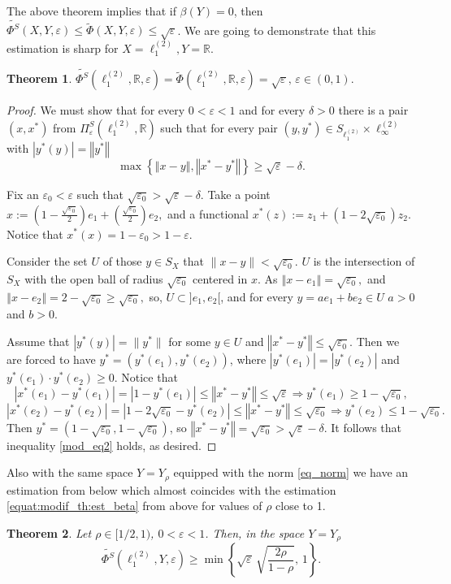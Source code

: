 \documentclass[11pt,a4paper]{amsart}
\newcommand{\R}{{\mathbb{R}}}
\newcommand{\eps}{\varepsilon}
\newcommand{\norm}[1]{\left\Vert#1\right\Vert}
\numberwithin{equation}{section}
\theoremstyle{plain}
\newtheorem{theorem}{Theorem}[section]
\theoremstyle{definition}
\renewcommand{\leq}{\leqslant}
\renewcommand{\geq}{\geqslant}
\begin{document}
The above theorem implies that if $\beta(Y)=0$, then $\widetilde{\Phi^S}(X,Y,\varepsilon)\leq\widetilde{\Phi}(X,Y,\varepsilon)\leq\sqrt{\varepsilon}$. We are going to demonstrate that this estimation is sharp for $X=\ell^{(2)}_1, Y=\R$.

\begin{theorem}
\quad $\widetilde{\Phi^S}(\ell^{(2)}_1,\R,\varepsilon) = \widetilde{\Phi}(\ell^{(2)}_1,\R,\varepsilon) =\sqrt{\varepsilon} , \,\eps\in(0, 1).$
\end{theorem}
\begin{proof}
We must show that for every $0<\eps<1$ and for every $\delta> 0$ there is a pair $(x, x^*)$ from $\Pi^S_\eps(\ell^{(2)}_1, \R)$ such that for every pair $(y, y^*)\in S_{\ell^{(2)}_1}\times \ell^{(2)}_\infty$ with $|y^*(y)|=\norm{y^*}$
\begin{equation}\label{mod_eq2}
\max\left\{ \norm{x-y}, \norm{x^*-y^*}\right\}\geq \sqrt{\varepsilon}-\delta.
\end{equation}

Fix an $\eps_0<\eps$ such that $\sqrt{\eps_0}>\sqrt{\eps}-\delta$. Take a point $x:=\left( 1-\frac{\sqrt{\eps_0}}{2}\right)e_1 +\left( \frac{\sqrt{\eps_0}}{2} \right)e_2,$
and a functional 
$x^*(z):=z_1+(1-2\sqrt{\eps_0})z_2.$
Notice that $x^*(x)=1-\eps_0>1-\eps$. 

Consider the set $U$ of those $y \in S_X$ that  $\|x-y\| <\sqrt{\eps_0}$. $U$ is the intersection of $S_X$ with the open ball of radius $\sqrt{\eps_0}$  centered in $x$. 
As $\norm{x-e_1}=\sqrt{\eps_0},$ and $\norm{x-e_2}=2 - \sqrt{\eps_0}\geq\sqrt{\eps_0},$ so, $U\subset]e_1, e_2[$, and for every $y=ae_1+be_2 \in U$ $a>0$ and $b>0$.

 Assume that $|y^*(y)|=\|y^*\|$ for some $y\in U$ and $\norm{x^*-y^*}\leq\sqrt{\eps_0}$. Then we are forced to have $y^*=(y^*(e_1), y^*(e_2))$, where $|y^*(e_1)|=|y^*(e_2)| $ and $y^*(e_1)\cdot y^*(e_2)\geq 0$. Notice that  
$$|x^*(e_1)-y^*(e_1)|=|1-y^*(e_1)|\leq \norm{x^*-y^*}\leq \sqrt{\eps}\Rightarrow y^*(e_1)\geq 1-\sqrt{\eps_0},$$
$$|x^*(e_2)-y^*(e_2)|=|1-2\sqrt{\eps_0}-y^*(e_2)|\leq \norm{x^*-y^*}\leq \sqrt{\eps_0}\Rightarrow y^*(e_2)\leq 1-\sqrt{\eps_0}.$$
Then $y^*=(1-\sqrt{\eps_0}, 1-\sqrt{\eps_0})$, so $\norm{x^*-y^*}=\sqrt{\eps_0}>\sqrt{\eps}-\delta$. It follows that inequality \eqref{mod_eq2} holds, as desired. 
\end{proof}

Also with the same space $Y = Y_\rho$  equipped with the norm  \eqref{eq_norm} we have an estimation from below which almost coincides with the estimation \eqref{equat:modif_th:est_beta} from above for values of $\rho$ close to 1.
\begin{theorem} Let $ \rho \in [1/2, 1)$, $0<\eps< 1$. Then, in the space $Y = Y_\rho$ 
$$
\widetilde{\Phi^S}(\ell_1^{(2)},Y,\varepsilon) \geq \min \left\lbrace\sqrt{\eps}\,\sqrt{\frac{2\rho}{1-\rho}}, \,1\right\rbrace.
$$
\end{theorem}
\end{document}
